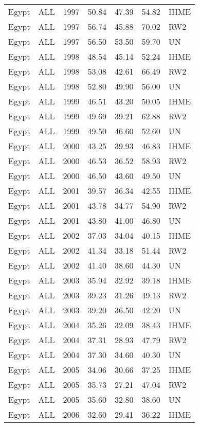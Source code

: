 \begin{longtable}{lllrrrl}
  Egypt & ALL & 1997 & 50.84 & 47.39 & 54.82 & IHME \\ 
  Egypt & ALL & 1997 & 56.74 & 45.88 & 70.02 & RW2 \\ 
  Egypt & ALL & 1997 & 56.50 & 53.50 & 59.70 & UN \\ 
  Egypt & ALL & 1998 & 48.54 & 45.14 & 52.24 & IHME \\ 
  Egypt & ALL & 1998 & 53.08 & 42.61 & 66.49 & RW2 \\ 
  Egypt & ALL & 1998 & 52.80 & 49.90 & 56.00 & UN \\ 
  Egypt & ALL & 1999 & 46.51 & 43.20 & 50.05 & IHME \\ 
  Egypt & ALL & 1999 & 49.69 & 39.21 & 62.88 & RW2 \\ 
  Egypt & ALL & 1999 & 49.50 & 46.60 & 52.60 & UN \\ 
  Egypt & ALL & 2000 & 43.25 & 39.93 & 46.83 & IHME \\ 
  Egypt & ALL & 2000 & 46.53 & 36.52 & 58.93 & RW2 \\ 
  Egypt & ALL & 2000 & 46.50 & 43.60 & 49.50 & UN \\ 
  Egypt & ALL & 2001 & 39.57 & 36.34 & 42.55 & IHME \\ 
  Egypt & ALL & 2001 & 43.78 & 34.77 & 54.90 & RW2 \\ 
  Egypt & ALL & 2001 & 43.80 & 41.00 & 46.80 & UN \\ 
  Egypt & ALL & 2002 & 37.03 & 34.04 & 40.15 & IHME \\ 
  Egypt & ALL & 2002 & 41.34 & 33.18 & 51.44 & RW2 \\ 
  Egypt & ALL & 2002 & 41.40 & 38.60 & 44.30 & UN \\ 
  Egypt & ALL & 2003 & 35.94 & 32.92 & 39.18 & IHME \\ 
  Egypt & ALL & 2003 & 39.23 & 31.26 & 49.13 & RW2 \\ 
  Egypt & ALL & 2003 & 39.20 & 36.50 & 42.20 & UN \\ 
  Egypt & ALL & 2004 & 35.26 & 32.09 & 38.43 & IHME \\ 
  Egypt & ALL & 2004 & 37.31 & 28.93 & 47.79 & RW2 \\ 
  Egypt & ALL & 2004 & 37.30 & 34.60 & 40.30 & UN \\ 
  Egypt & ALL & 2005 & 34.06 & 30.66 & 37.25 & IHME \\ 
  Egypt & ALL & 2005 & 35.73 & 27.21 & 47.04 & RW2 \\ 
  Egypt & ALL & 2005 & 35.60 & 32.80 & 38.60 & UN \\ 
  Egypt & ALL & 2006 & 32.60 & 29.41 & 36.22 & IHME \\ 

\end{longtable}
